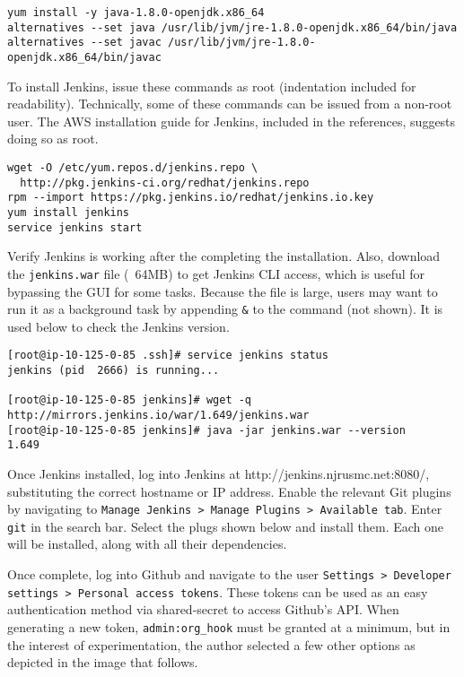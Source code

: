 \begin{verbatim}
yum install -y java-1.8.0-openjdk.x86_64
alternatives --set java /usr/lib/jvm/jre-1.8.0-openjdk.x86_64/bin/java
alternatives --set javac /usr/lib/jvm/jre-1.8.0-openjdk.x86_64/bin/javac
\end{verbatim}

To install Jenkins, issue these commands as root (indentation included for
readability). Technically, some of these commands can be issued from a
non-root user. The AWS installation guide for Jenkins, included in the
references, suggests doing so as root.

\begin{verbatim}
wget -O /etc/yum.repos.d/jenkins.repo \
  http://pkg.jenkins-ci.org/redhat/jenkins.repo
rpm --import https://pkg.jenkins.io/redhat/jenkins.io.key
yum install jenkins
service jenkins start
\end{verbatim}

Verify Jenkins is working after the completing the installation. Also,
download the \verb|jenkins.war| file (~64MB) to get Jenkins CLI access, which is
useful for bypassing the GUI for some tasks. Because the file is large, users
may want to run it as a background task by appending \verb|&| to the command
(not shown). It is used below to check the Jenkins version.

\begin{verbatim}
[root@ip-10-125-0-85 .ssh]# service jenkins status
jenkins (pid  2666) is running...

[root@ip-10-125-0-85 jenkins]# wget -q http://mirrors.jenkins.io/war/1.649/jenkins.war
[root@ip-10-125-0-85 jenkins]# java -jar jenkins.war --version
1.649
\end{verbatim}

Once Jenkins installed, log into Jenkins at http://jenkins.njrusmc.net:8080/,
substituting the correct hostname or IP address. Enable the relevant Git
plugins by navigating to \verb|Manage Jenkins > Manage Plugins > Available tab|.
Enter \verb|git| in the search bar. Select the plugs shown below and install
them. Each one will be installed, along with all their dependencies.


Once complete, log into Github and navigate to the user
\verb|Settings > Developer settings > Personal access tokens|. These tokens
can be used as an easy authentication method via shared-secret to access
Github's API\@. When generating a new token, \verb|admin:org_hook| must be granted at a
minimum, but in the interest of experimentation, the author selected a few
other options as depicted in the image that follows.

